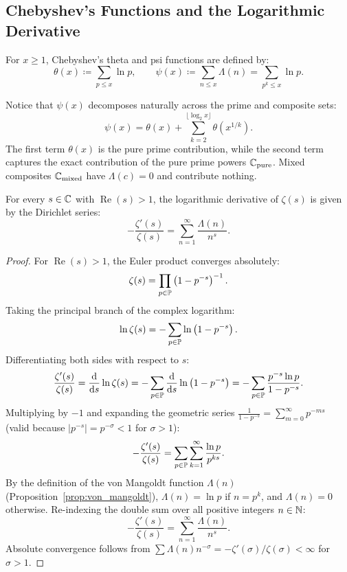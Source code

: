\subsection{Chebyshev's Functions and the Logarithmic Derivative}

\begin{definition}
\label{def:chebyshev_functions}
\leanok
For $x \ge 1$, Chebyshev's theta and psi functions are defined by:
\begin{equation}
\label{eq:chebyshev_defs}
\theta(x) \coloneqq \sum_{p \le x} \ln p, \qquad \psi(x) \coloneqq \sum_{n \le x} \Lambda(n) = \sum_{p^k \le x} \ln p.
\end{equation}
\end{definition}

Notice that $\psi(x)$ decomposes naturally across the prime and composite sets:
\begin{equation}
\psi(x) = \theta(x) + \sum_{k=2}^{\lfloor \log_2 x \rfloor} \theta\left(x^{1/k}\right).
\end{equation}
The first term $\theta(x)$ is the pure prime contribution, while the second term captures the exact contribution of the pure prime powers $\mathbb{C}_{\mathrm{pure}}$. Mixed composites $\mathbb{C}_{\mathrm{mixed}}$ have $\Lambda(c) = 0$ and contribute nothing.

\begin{lemma}
\label{lem:log_derivative_zeta}
\leanok
For every $s \in \mathbb{C}$ with $\operatorname{Re}(s) > 1$, the logarithmic derivative of $\zeta(s)$ is given by the Dirichlet series:
\begin{equation}
\label{eq:zeta_log_derivative}
-\frac{\zeta'(s)}{\zeta(s)} = \sum_{n=1}^\infty \frac{\Lambda(n)}{n^s}.
\end{equation}
\end{lemma}

\begin{proof}
\leanok
For $\operatorname{Re}(s) > 1$, the Euler product converges absolutely:
$$\zeta(s) = \prod_{p \in \mathbb{P}} \left(1 - p^{-s}\right)^{-1}.$$
Taking the principal branch of the complex logarithm:
$$\ln \zeta(s) = -\sum_{p \in \mathbb{P}} \ln\left(1 - p^{-s}\right).$$
Differentiating both sides with respect to $s$:
$$\frac{\zeta'(s)}{\zeta(s)} = \frac{\mathrm{d}}{\mathrm{d} s} \ln \zeta(s) = -\sum_{p \in \mathbb{P}} \frac{\mathrm{d}}{\mathrm{d} s} \ln\left(1 - p^{-s}\right) = -\sum_{p \in \mathbb{P}} \frac{p^{-s} \ln p}{1 - p^{-s}}.$$
Multiplying by $-1$ and expanding the geometric series $\frac{1}{1 - p^{-s}} = \sum_{m=0}^\infty p^{-m s}$ (valid because $|p^{-s}| = p^{-\sigma} < 1$ for $\sigma > 1$):
$$-\frac{\zeta'(s)}{\zeta(s)} = \sum_{p \in \mathbb{P}} \sum_{k=1}^\infty \frac{\ln p}{p^{k s}}.$$
By the definition of the von Mangoldt function $\Lambda(n)$ (Proposition~\ref{prop:von_mangoldt}), $\Lambda(n) = \ln p$ if $n = p^k$, and $\Lambda(n) = 0$ otherwise.
Re-indexing the double sum over all positive integers $n \in \mathbb{N}$:
$$-\frac{\zeta'(s)}{\zeta(s)} = \sum_{n=1}^\infty \frac{\Lambda(n)}{n^s}.$$
Absolute convergence follows from $\sum \Lambda(n) n^{-\sigma} = -\zeta'(\sigma)/\zeta(\sigma) < \infty$ for $\sigma > 1$.
\end{proof}

